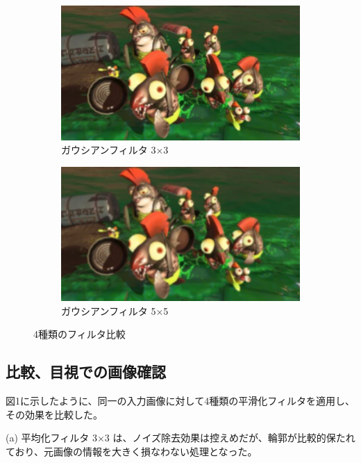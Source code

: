\documentclass[a4paper,11pt,titlepage]{jsarticle}
\begin{document}
\begin{figure}[htbp]
  \begin{subfigure}{0.4\textwidth}
    \includegraphics[width=\linewidth]{syake_filter_Gauss_3x3.png}
    \caption{ガウシアンフィルタ 3×3}
  \end{subfigure}
  \hfill
  \begin{subfigure}{0.4\textwidth}
    \includegraphics[width=\linewidth]{syake_filter_Gauss_5x5.png}
    \caption{ガウシアンフィルタ 5×5}
  \end{subfigure}

  \caption{4種類のフィルタ比較}
\end{figure}

\subsection{比較、目視での画像確認}

図1に示したように、同一の入力画像に対して4種類の平滑化フィルタを適用し、その効果を比較した。

(a) 平均化フィルタ 3×3 は、ノイズ除去効果は控えめだが、輪郭が比較的保たれており、元画像の情報を大きく損なわない処理となった。
\end{document}
